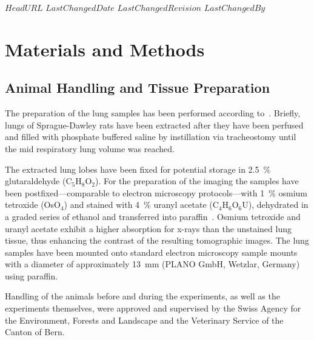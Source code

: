 \svnidlong
{$HeadURL$}
{$LastChangedDate$}
{$LastChangedRevision$}
{$LastChangedBy$}

\ifhtml
\else
\begin{center}
\end{center}
\fi

\section{Materials and Methods}
\label{sec:materials and methods}
\subsection{Animal Handling and Tissue Preparation}
The preparation of the lung samples has been performed according to~\citet{Schittny1997,Schittny1998}. Briefly, lungs of Sprague-Dawley rats have been extracted after they have been perfused and filled with phosphate buffered saline by instillation via tracheostomy until the mid respiratory lung volume was reached.

The extracted lung lobes have been fixed for potential storage in \SI{2.5}{\percent} glutaraldehyde (C$_5$H$_8$O$_2$). For the preparation of the imaging the samples have been postfixed---comparable to electron microscopy protocols---with \SI{1}{\percent} osmium tetroxide (OsO$_4$) and stained with \SI{4}{\percent} uranyl acetate (C$_4$H$_6$O$_6$U), dehydrated in a graded series of ethanol and transferred into paraffin~\cite{Schittny1997}\cite{Schittny1998}. Osmium tetroxide and uranyl acetate exhibit a higher absorption for x-rays than the unstained lung tissue, thus enhancing the contrast of the resulting tomographic images. The lung samples have been mounted onto standard electron microscopy sample mounts with a diameter of approximately \SI{13}{\milli\meter} (PLANO GmbH, Wetzlar, Germany) using paraffin.

Handling of the animals before and during the experiments, as well as the experiments themselves, were approved and supervised by the Swiss Agency for the Environment, Forests and Landscape and the Veterinary Service of the Canton of Bern.

